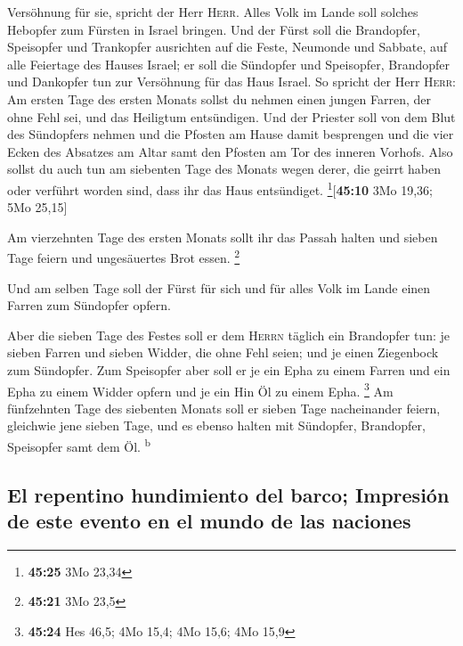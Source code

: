 Versöhnung für sie, spricht der Herr \textsc{Herr}. 
Alles Volk im Lande soll solches Hebopfer zum Fürsten in Israel bringen.
 Und der Fürst soll die Brandopfer, Speisopfer und
Trankopfer ausrichten auf die Feste, Neumonde und Sabbate, auf alle
Feiertage des Hauses Israel; er soll die Sündopfer und Speisopfer,
Brandopfer und Dankopfer tun zur Versöhnung für das Haus Israel.
 So spricht der Herr \textsc{Herr}: Am ersten Tage des
ersten Monats sollst du nehmen einen jungen Farren, der ohne Fehl sei,
und das Heiligtum entsündigen.  Und der Priester soll von
dem Blut des Sündopfers nehmen und die Pfosten am Hause damit besprengen
und die vier Ecken des Absatzes am Altar samt den Pfosten am Tor des
inneren Vorhofs.  Also sollst du auch tun am siebenten
Tage des Monats wegen derer, die geirrt haben oder verführt worden sind,
dass ihr das Haus entsündiget. \footnote{\textbf{45:25} 3Mo 23,34}{[}\textbf{45:10}
3Mo 19,36; 5Mo 25,15{]}

 Am vierzehnten Tage des ersten Monats sollt ihr das
Passah halten und sieben Tage feiern und ungesäuertes Brot essen.
\footnote{\textbf{45:21} 3Mo 23,5}

 Und am selben Tage soll der Fürst für sich und für alles
Volk im Lande einen Farren zum Sündopfer opfern.

 Aber die sieben Tage des Festes soll er dem
\textsc{Herrn} täglich ein Brandopfer tun: je sieben Farren und sieben
Widder, die ohne Fehl seien; und je einen Ziegenbock zum Sündopfer.
 Zum Speisopfer aber soll er je ein Epha zu einem Farren
und ein Epha zu einem Widder opfern und je ein Hin Öl zu einem Epha.
\footnote{\textbf{45:24} Hes 46,5; 4Mo 15,4; 4Mo 15,6; 4Mo 15,9}
 Am fünfzehnten Tage des siebenten Monats soll er sieben
Tage nacheinander feiern, gleichwie jene sieben Tage, und es ebenso
halten mit Sündopfer, Brandopfer, Speisopfer samt dem Öl.
\textsuperscript{b}

\hypertarget{el-repentino-hundimiento-del-barco-impresiuxf3n-de-este-evento-en-el-mundo-de-las-naciones}{%
\subsection{El repentino hundimiento del barco; Impresión de este evento
en el mundo de las
naciones}\label{el-repentino-hundimiento-del-barco-impresiuxf3n-de-este-evento-en-el-mundo-de-las-naciones}}

